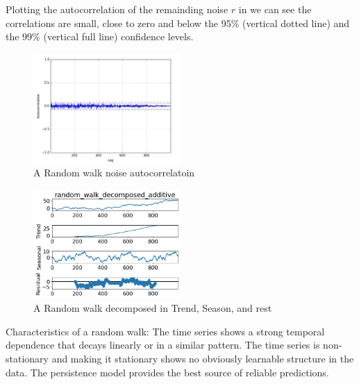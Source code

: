 Plotting the autocorrelation of the remainding noise $r$ in 
we can see the correlations are small, close to zero and below the 95\% (vertical dotted line) and the 99\% (vertical full line)
confidence levels.
\begin{figure}[H]
  \centering
  \includegraphics[width=0.5\textwidth]{./figs/illustrations/random_walk_noise_autocorrelation.png}
  \hfill
  \caption{A Random walk noise autocorrelatoin}
  \label{fig:dataset:random_walk_noise_autocorrelation}
\end{figure}
\begin{figure}[H]
  \centering
  \includegraphics[width=0.5\textwidth]{./figs/code_generated/data_exploration/random_walk_decomposed_additive.png}
  \hfill
  \caption{A Random walk decomposed in Trend, Season, and rest}
  \label{fig:dataset:random_walk_decomposed}
\end{figure}


Characteristics of a random walk:
The time series shows a strong temporal dependence that decays linearly or in a similar pattern.
The time series is non-stationary and making it stationary shows no obviously learnable structure in the data.
The persistence model provides the best source of reliable predictions.
